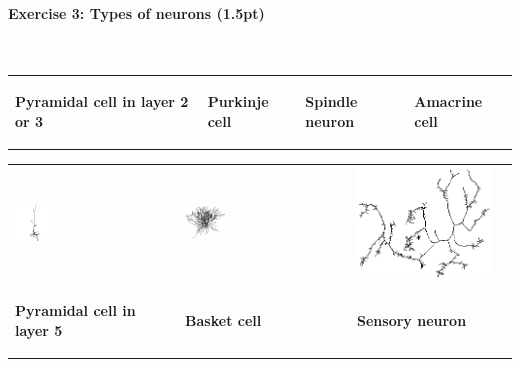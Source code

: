 \documentclass[a4paper,11pt]{article}
\newenvironment{exercise}[3]{\paragraph{Exercise #1: #2 (#3pt)}\ \\}{
\medskip}
\begin{document}
\begin{exercise}{3}{Types of neurons}{1.5}
\begin{tabular}{p{3.7cm} p{3.7cm} p{3.7cm} p{3.7cm}}
\begin{center}\textbf{Pyramidal cell in layer 2 or 3}\end{center}&
\begin{center}\textbf{Purkinje cell}\end{center}&
\begin{center}\textbf{Spindle neuron}\end{center}&
\begin{center}\textbf{Amacrine cell}\end{center} \\
\end{tabular}
\begin{tabular}{p{3.7cm} p{3.7cm} p{3.7cm} p{3.7cm}}
\includegraphics[width=0.25\textwidth]{pyramidal5.png} &
\includegraphics[width=0.25\textwidth]{bascet.png} &
\includegraphics[height=0.25\textwidth]{sensory.png} &
 \\

\begin{center}\textbf{Pyramidal cell in layer 5}\end{center}&
\begin{center}\textbf{Basket cell}\end{center}&
\begin{center}\textbf{Sensory neuron}\end{center}&
\begin{center}\textbf{}\end{center} \\
\end{tabular}



\end{exercise}
\end{document}
